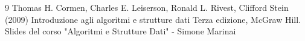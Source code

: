 \begin{thebibliography}{9}
	Thomas H. Cormen, Charles E. Leiserson, Ronald L. Rivest, Clifford Stein (2009) Introduzione agli algoritmi e strutture dati Terza edizione, McGraw Hill.
	Slides del corso "Algoritmi e Strutture Dati" - Simone Marinai
\end{thebibliography}